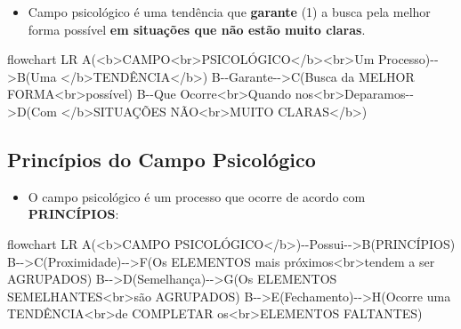 \documentclass[
]{book}
\newenvironment{Shaded}{\begin{snugshade}}{\end{snugshade}}
\newcommand{\NormalTok}[1]{#1}
\providecommand{\tightlist}{%
  \setlength{\itemsep}{0pt}\setlength{\parskip}{0pt}}
\begin{document}
\begin{itemize}
\tightlist
\item
  Campo psicológico é uma tendência que \textbf{garante} (1) a busca pela melhor forma possível \textbf{em situações que não estão muito claras}.
\end{itemize}

\begin{Shaded}
\begin{Highlighting}[]
\NormalTok{flowchart LR}
\NormalTok{A(\textless{}b\textgreater{}CAMPO\textless{}br\textgreater{}PSICOLÓGICO\textless{}/b\textgreater{}\textless{}br\textgreater{}Um Processo){-}{-}\textgreater{}B(Uma \textless{}/b\textgreater{}TENDÊNCIA\textless{}/b\textgreater{})}
\NormalTok{B{-}{-}Garante{-}{-}\textgreater{}C(Busca da MELHOR FORMA\textless{}br\textgreater{}possível)}
\NormalTok{B{-}{-}Que Ocorre\textless{}br\textgreater{}Quando nos\textless{}br\textgreater{}Deparamos{-}{-}\textgreater{}D(Com \textless{}/b\textgreater{}SITUAÇÕES NÃO\textless{}br\textgreater{}MUITO CLARAS\textless{}/b\textgreater{})}
\end{Highlighting}
\end{Shaded}

\hypertarget{princuxedpios-do-campo-psicoluxf3gico}{%
\subsection{Princípios do Campo Psicológico}\label{princuxedpios-do-campo-psicoluxf3gico}}

\begin{itemize}
\tightlist
\item
  O campo psicológico é um processo que ocorre de acordo com \textbf{PRINCÍPIOS}:
\end{itemize}

\begin{Shaded}
\begin{Highlighting}[]
\NormalTok{flowchart LR}
\NormalTok{A(\textless{}b\textgreater{}CAMPO PSICOLÓGICO\textless{}/b\textgreater{}){-}{-}Possui{-}{-}\textgreater{}B(PRINCÍPIOS)}
\NormalTok{B{-}{-}\textgreater{}C(Proximidade){-}{-}\textgreater{}F(Os ELEMENTOS mais próximos\textless{}br\textgreater{}tendem a ser AGRUPADOS)}
\NormalTok{B{-}{-}\textgreater{}D(Semelhança){-}{-}\textgreater{}G(Os ELEMENTOS SEMELHANTES\textless{}br\textgreater{}são AGRUPADOS)}
\NormalTok{B{-}{-}\textgreater{}E(Fechamento){-}{-}\textgreater{}H(Ocorre uma TENDÊNCIA\textless{}br\textgreater{}de COMPLETAR os\textless{}br\textgreater{}ELEMENTOS FALTANTES)}
\end{Highlighting}
\end{Shaded}
\end{document}
